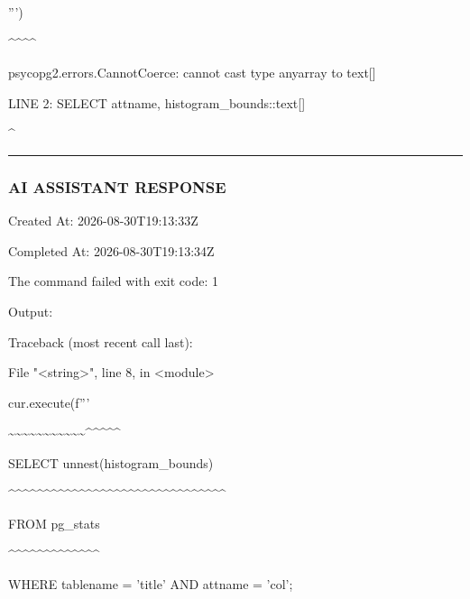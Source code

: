 \documentclass[11pt,a4paper]{article}
\begin{document}
{''')

\textasciicircum{}\textasciicircum{}\textasciicircum{}\textasciicircum{}

psycopg2.errors.CannotCoerce: cannot cast type anyarray to text[]

LINE 2:     SELECT attname, histogram\_bounds::text[]

\textasciicircum{}


\hrule

\subsubsection{AI ASSISTANT RESPONSE}

Created At: 2026-08-30T19:13:33Z

Completed At: 2026-08-30T19:13:34Z


The command failed with exit code: 1

Output:

Traceback (most recent call last):

File "<string>", line 8, in <module>

cur.execute(f'''

\textasciitilde{}\textasciitilde{}\textasciitilde{}\textasciitilde{}\textasciitilde{}\textasciitilde{}\textasciitilde{}\textasciitilde{}\textasciitilde{}\textasciitilde{}\textasciitilde{}\textasciicircum{}\textasciicircum{}\textasciicircum{}\textasciicircum{}\textasciicircum{}

SELECT unnest(histogram\_bounds)

\textasciicircum{}\textasciicircum{}\textasciicircum{}\textasciicircum{}\textasciicircum{}\textasciicircum{}\textasciicircum{}\textasciicircum{}\textasciicircum{}\textasciicircum{}\textasciicircum{}\textasciicircum{}\textasciicircum{}\textasciicircum{}\textasciicircum{}\textasciicircum{}\textasciicircum{}\textasciicircum{}\textasciicircum{}\textasciicircum{}\textasciicircum{}\textasciicircum{}\textasciicircum{}\textasciicircum{}\textasciicircum{}\textasciicircum{}\textasciicircum{}\textasciicircum{}\textasciicircum{}\textasciicircum{}\textasciicircum{}

FROM pg\_stats

\textasciicircum{}\textasciicircum{}\textasciicircum{}\textasciicircum{}\textasciicircum{}\textasciicircum{}\textasciicircum{}\textasciicircum{}\textasciicircum{}\textasciicircum{}\textasciicircum{}\textasciicircum{}\textasciicircum{}

WHERE tablename = 'title' AND attname = '{col}';

}
\end{document}
